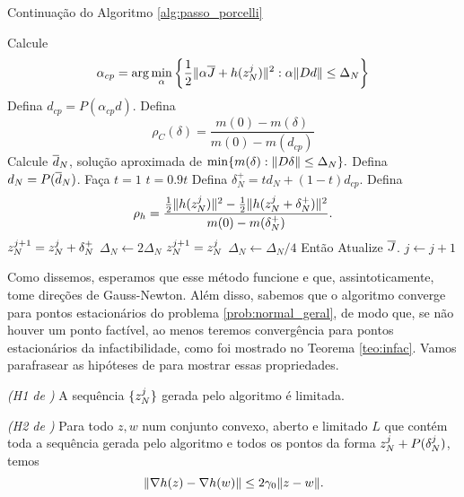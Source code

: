 \begin{algorithm}[H]
\caption*{Continuação do Algoritmo \ref{alg:passo_porcelli}}
\begin{algorithmic}
  \State Calcule
\begin{equation}
  \alpha_{cp} = \arg\min_{\alpha}\bigg\{ \frac{1}{2} \Vert \alpha\overline{J} +
    h(z_N^j)\Vert^2 : \alpha \Vert Dd\Vert \leq \Delta_N\bigg\}
\end{equation}
  \State Defina $d_{cp} = P(\alpha_{cp}d)$.
  \State Defina
    $$\rho_C(\delta) = \frac{m(0) - m(\delta)}{m(0) - m(d_{cp})}$$
  \State Calcule $\overline{d}_N$, solução aproximada de $\min\{m(\delta) : 
    \Vert D\delta\Vert \leq \Delta_N\}.$\label{alg:sol_aprox_newton}
  \State Defina $d_N = P(\overline{d}_N)$.
  \State Faça $t = 1$
    \State $t = 0.9t$
  \EndWhile
  \State Defina $\delta_N^+ = t d_{N} + (1 - t) d_{cp}$.
  \State Defina
$$ \rho_h = \frac{ \frac{1}{2}\Vert h(z_N^j)\Vert^2 -
\frac{1}{2}\Vert h(z_N^j+\delta_N^+)\Vert^2} { m(0) - m(\delta_N^+) }. $$
    \State $z_N^{j+1} = z_N^j + \delta_N^+$
    \State $\Delta_N \gets 2\Delta_N$
  \Else
    \State $z_N^{j+1} = z_N^j$
    \State $\Delta_N \gets \Delta_N/4$
  \EndIf
    \State Então Atualize $\overline{J}$.
  \EndIf
  \State $j\gets j + 1$
\EndWhile
\end{algorithmic}
\end{algorithm}
Como dissemos, esperamos que esse método funcione e que, assintoticamente, tome
direções de Gauss-Newton. Além disso, sabemos que o algoritmo converge para
pontos estacionários do problema \eqref{prob:normal_geral}, de modo que, se não
houver um ponto factível, ao menos teremos convergência para pontos
estacionários da infactibilidade, como foi mostrado no Teorema
\ref{teo:infac}.
Vamos parafrasear as hipóteses de \cite{bib:francisco} para mostrar essas
propriedades.
\begin{hypoenv}
  \emph{(H1 de \cite{bib:francisco})}
  A sequência $\{z_N^j\}$ gerada pelo algoritmo é limitada.
\end{hypoenv}
\begin{hypoenv}
  \emph{(H2 de \cite{bib:francisco})}
  Para todo $z,w$ num conjunto convexo, aberto e limitado $L$ que contém toda a
  sequência gerada pelo algoritmo e todos os pontos da forma
  $z_N^j+P(\delta_N^j)$,  temos
  $$ \Vert \nabla h(z) - \nabla h(w)\Vert \leq 2\gamma_0\Vert z-w\Vert. $$
\end{hypoenv}
